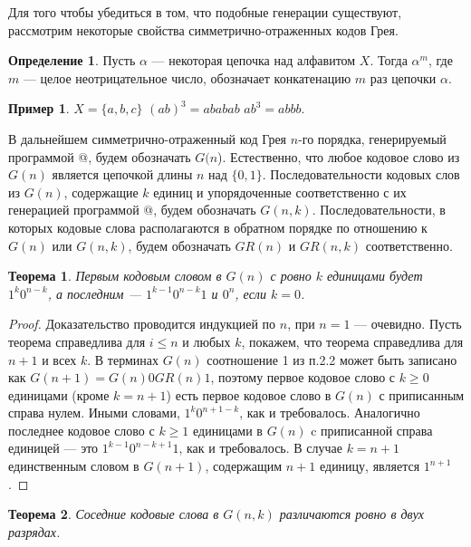 \documentclass[12pt,a4paper]{article}
\theoremstyle{plain}
\newtheorem{theorem}{Теорема}
\theoremstyle{definition}
\newtheorem{definition}{Определение}
\newtheorem*{example}{Пример}
\theoremstyle{remark}
\begin{document}
Для того чтобы убедиться в том, что подобные генерации существуют, рассмотрим некоторые свойства симметрично-отраженных кодов Грея. 

\begin{definition}
Пусть $\alpha$ --- некоторая цепочка над алфавитом $X$. Тогда $\alpha^m$, где $m$ --- целое неотрицательное число, обозначает конкатенацию $m$ раз цепочки $\alpha$.
\end{definition}

\begin{example}
$X=\{a,b,c\}$ $(ab)^3=ababab$ $ab^3=abbb$.
\end{example}

В дальнейшем симметрично-отраженный код Грея $n$-го порядка, генерируемый программой @, будем обозначать $G(n$). Естественно, что любое кодовое слово из $G(n)$ является цепочкой длины $n$ над $\{0,1\}$. Последовательности кодовых слов из $G(n)$, содержащие $k$ единиц и упорядоченные соответственно с их генерацией программой @, будем обозначать $G(n,k)$. Последовательности, в которых кодовые слова располагаются в обратном порядке по отношению к $G(n)$ или $G(n,k)$, будем обозначать $GR(n)$ и $GR(n,k)$ соответственно. 

\begin{theorem}
\label{thm:4.1}
Первым кодовым словом в $G(n)$ с ровно $k$ единицами будет $1^k0^{n-k}$, а последним --- $1^{k-1}0^{n-k}1$ и $0^n$, если $k=0$.
\end{theorem}

\begin{proof}
Доказательство проводится индукцией по $n$, при $n=1$ --- очевидно. Пусть теорема справедлива для $i\le n$ и любых $k$, покажем, что теорема справедлива для $n+1$ и всех $k$. В терминах $G(n)$ соотношение {1} из п.2.2 может быть записано как $G(n+1)=G(n)0GR(n)1$, поэтому первое кодовое слово с $k\ge 0$ единицами (кроме $k=n+1$) есть первое кодовое слово в $G(n)$ с приписанным справа нулем. Иными словами, $1^k0^{n+1-k}$, как и требовалось. Аналогично последнее кодовое слово с $k\ge 1$ единицами в $G(n)$ c приписанной справа единицей --- это $1^{k-1}0^{n-k+1}1$, как и требовалось. В случае $k=n+1$ единственным словом в $G(n+1)$, содержащим $n+1$ единицу, является $1^{n+1}$.
\end{proof}

\begin{theorem}
Соседние кодовые слова в $G(n,k)$ различаются ровно в двух разрядах.
\end{theorem}
\end{document}
